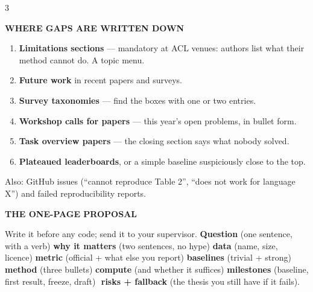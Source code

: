 \documentclass[10pt,a4paper]{article}
\newcommand{\head}[1]{%
  \vspace{4.5pt}{\color{brand}\rule{\linewidth}{0.9pt}}\par\vspace{1.5pt}%
  {\bfseries\color{brand}\MakeUppercase{#1}}\par\vspace{2pt}}
\newcommand{\dt}{\,\textperiodcentered\,\allowbreak}
\begin{document}
\begin{multicols}{3}
\head{Where gaps are written down}
\begin{enumerate}
  \item \textbf{Limitations sections} --- mandatory at ACL venues: authors list
        what their method cannot do. A topic menu.
  \item \textbf{Future work} in recent papers and surveys.
  \item \textbf{Survey taxonomies} --- find the boxes with one or two entries.
  \item \textbf{Workshop calls for papers} --- this year's open problems, in
        bullet form.
  \item \textbf{Task overview papers} --- the closing section says what nobody
        solved.
  \item \textbf{Plateaued leaderboards}, or a simple baseline suspiciously
        close to the top.
\end{enumerate}
Also: GitHub issues (``cannot reproduce Table 2'', ``does not work for language
X'') and failed reproducibility reports.

\head{The one-page proposal}
Write it before any code; send it to your supervisor.
\textbf{Question} (one sentence, with a verb)\dt \textbf{why it matters} (two
sentences, no hype)\dt \textbf{data} (name, size, licence)\dt \textbf{metric}
(official + what else you report)\dt \textbf{baselines} (trivial + strong)\dt
\textbf{method} (three bullets)\dt \textbf{compute} (and whether it
suffices)\dt \textbf{milestones} (baseline, first result, freeze, draft)\dt
\textbf{risks + fallback} (the thesis you still have if it fails).


\end{multicols}
\end{document}
